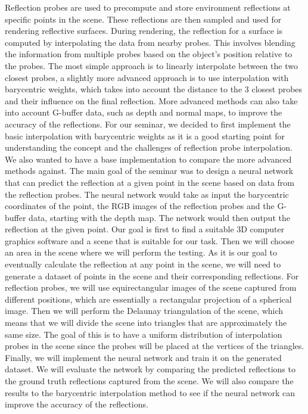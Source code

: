 Reflection probes are used to precompute and store environment reflections at specific points in the scene. These reflections are then sampled and used for rendering reflective surfaces.
During rendering, the reflection for a surface is computed by interpolating the data from nearby probes. This involves blending the information from multiple probes based on the object's position relative to the probes.
The most simple approach is to linearly interpolate between the two closest probes, a slightly more advanced approach is to use interpolation with barycentric weights, which takes into account the distance to the 3 closest probes and their influence on the final reflection.
More advanced methods can also take into account G-buffer data, such as depth and normal maps, to improve the accuracy of the reflections.
For our seminar, we decided to first implement the basic interpolation with barycentric weights as it is a good starting point for understanding the concept and the challenges of reflection probe interpolation.
We also wanted to have a base implementation to compare the more advanced methods against. 
The main goal of the seminar was to design a neural network that can predict the reflection at a given point in the scene based on data from the reflection probes.
The neural network would take as input the barycentric coordinates of the point, the RGB images of the reflection probes and the G-buffer data, starting with the depth map.
The network would then output the reflection at the given point.
Our goal is first to find a suitable 3D computer graphics software and a scene that is suitable for our task. Then we will choose an area in the scene where we will perform the testing.
As it is our goal to eventually calculate the reflection at any point in the scene, we will need to generate a dataset of points in the scene and their corresponding reflections.
For reflection probes, we will use equirectangular images of the scene captured from different positions, which are essentially a rectangular projection of a spherical image. Then we will perform the Delaunay triangulation of the scene, which means that we will divide the scene into triangles that are approximately the same size.
The goal of this is to have a uniform distribution of interpolation probes in the scene since the probes will be placed at the vertices of the triangles.
Finally, we will implement the neural network and train it on the generated dataset. We will evaluate the network by comparing the predicted reflections to the ground truth reflections captured from the scene.
We will also compare the results to the barycentric interpolation method to see if the neural network can improve the accuracy of the reflections.


